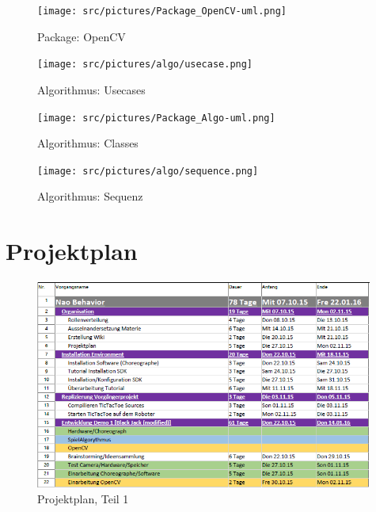 \begin{appendix}
        \begin{figure}[ht]
            \centering
            \texttt{[image: src/pictures/Package\_OpenCV-uml.png]}
            \caption{Package: OpenCV}
            \label{img:package:ocv}
        \end{figure}

        \cleardoubleemptypage

        \begin{figure}[ht]
            \centering
            \texttt{[image: src/pictures/algo/usecase.png]}
            \caption{Algorithmus: Usecases}
            \label{img:algo:usecases}
        \end{figure}

        \cleardoubleemptypage

        \begin{figure}[ht]
            \centering
            \texttt{[image: src/pictures/Package\_Algo-uml.png]}
            \caption{Algorithmus: Classes}
            \label{img:algo:classes}
        \end{figure}

        \cleardoubleemptypage

        \begin{figure}[ht]
            \centering
            \texttt{[image: src/pictures/algo/sequence.png]}
            \caption{Algorithmus: Sequenz}
            \label{img:algo:sequence}
        \end{figure}

        \cleardoubleemptypage

        \section{Projektplan}

            \begin{figure}[ht]
                \centering
                \includegraphics[width=0.99\textwidth]{src/pictures/planung1.png}
                \caption{Projektplan, Teil 1}
                \label{img:planung1}
            \end{figure}


\end{appendix}
